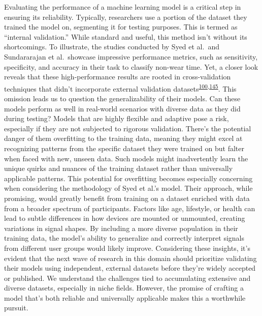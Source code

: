 \documentclass[
  10pt,
]{scrbook}
\begin{document}
Evaluating the performance of a machine learning model is a critical
step in ensuring its reliability. Typically, researchers use a portion
of the dataset they trained the model on, segmenting it for testing
purposes. This is termed as ``internal validation.'' While standard and
useful, this method isn't without its shortcomings. To illustrate, the
studies conducted by Syed et al.~and Sundararajan et al.~showcase
impressive performance metrics, such as sensitivity, specificity, and
accuracy in their task to classify non-wear time. Yet, a closer look
reveals that these high-performance results are rooted in
cross-validation techniques that didn't incorporate external validation
datasets\textsuperscript{\protect\hyperlink{ref-sundararajan_sleep_2021}{100},\protect\hyperlink{ref-syed_evaluating_2020}{145}}.
This omission leads us to question the generalizability of their models.
Can these models perform as well in real-world scenarios with diverse
data as they did during testing? Models that are highly flexible and
adaptive pose a risk, especially if they are not subjected to rigorous
validation. There's the potential danger of them overfitting to the
training data, meaning they might excel at recognizing patterns from the
specific dataset they were trained on but falter when faced with new,
unseen data. Such models might inadvertently learn the unique quirks and
nuances of the training dataset rather than universally applicable
patterns. This potential for overfitting becomes especially concerning
when considering the methodology of Syed et al.'s model. Their approach,
while promising, would greatly benefit from training on a dataset
enriched with data from a broader spectrum of participants. Factors like
age, lifestyle, or health can lead to subtle differences in how devices
are mounted or unmounted, creating variations in signal shapes. By
including a more diverse population in their training data, the model's
ability to generalize and correctly interpret signals from different
user groups would likely improve. Considering these insights, it's
evident that the next wave of research in this domain should prioritize
validating their models using independent, external datasets before
they're widely accepted or published. We understand the challenges tied
to accumulating extensive and diverse datasets, especially in niche
fields. However, the promise of crafting a model that's both reliable
and universally applicable makes this a worthwhile pursuit.
\end{document}
